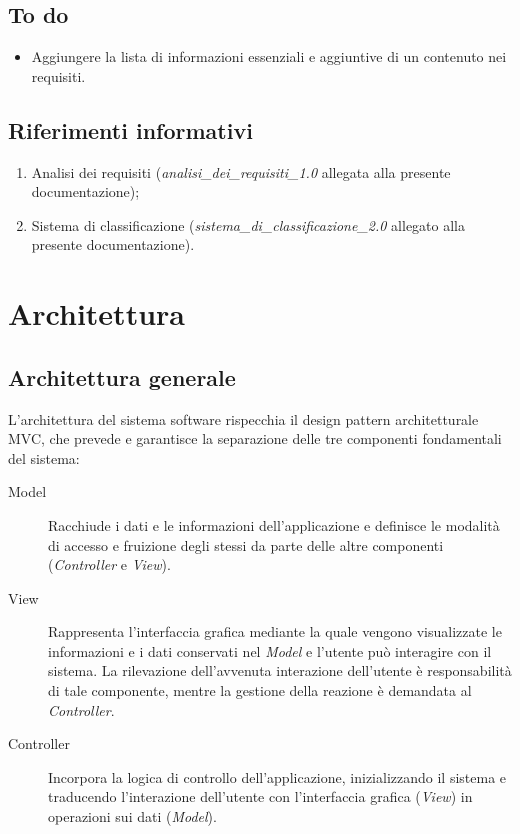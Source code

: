 \documentclass[10pt,a4paper,headinclude,footinclude,hidelinks]{scrreprt} %
\begin{document}
	\section{To do}
	\begin{itemize}
	\item Aggiungere la lista di informazioni essenziali e aggiuntive di un contenuto nei requisiti.
	\end{itemize}

	\section{Riferimenti informativi}
	\begin{enumerate}
	\item Analisi dei requisiti (\textit{analisi\_dei\_requisiti\_1.0} allegata alla presente documentazione);
	\item Sistema di classificazione (\textit{sistema\_di\_classificazione\_2.0} allegato alla presente documentazione).
	\end{enumerate}

	\chapter{Architettura}
	\label{ch:stage:design:architettura}

	\section{Architettura generale}
	\label{sec:stage:design:architettura:mvc}
	L'architettura del sistema software rispecchia il design pattern architetturale MVC, che prevede e garantisce la separazione delle tre componenti fondamentali del sistema:
	\begin{description}
	\item[Model] Racchiude i dati e le informazioni dell'applicazione e definisce le modalità di accesso e fruizione degli stessi da parte delle altre componenti (\textit{Controller} e \textit{View}).
 	\item[View] Rappresenta l'interfaccia grafica mediante la quale vengono visualizzate le informazioni e i dati conservati nel \textit{Model} e l'utente può interagire con il sistema. La rilevazione dell'avvenuta interazione dell'utente è responsabilità di tale componente, mentre la gestione della reazione è demandata al \textit{Controller}.
	\item[Controller] Incorpora la logica di controllo dell'applicazione, inizializzando il sistema e traducendo l'interazione dell'utente con l'interfaccia grafica (\textit{View}) in operazioni sui dati (\textit{Model}).
	\end{description}
\end{document}
